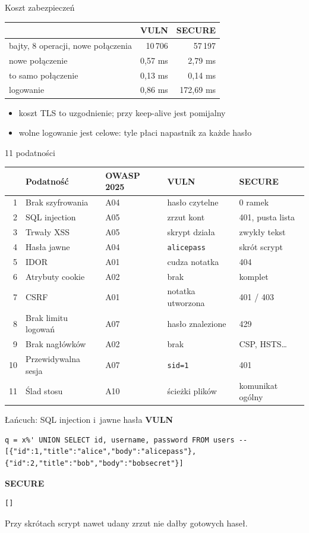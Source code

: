 \documentclass[aspectratio=169,10pt]{beamer}
\newcommand{\kod}[1]{\texttt{#1}}
\newcommand{\vuln}{\textcolor{v}{\textbf{VULN}}}
\newcommand{\secure}{\textcolor{s}{\textbf{SECURE}}}
\begin{document}
\begin{frame}{Koszt zabezpieczeń}
\begin{tabular}{lrr}
\toprule
& \vuln & \secure\\\midrule
bajty, 8 operacji, nowe połączenia & 10\,706 & 57\,197\\
nowe połączenie & 0{,}57 ms & 2{,}79 ms\\
to samo połączenie & 0{,}13 ms & 0{,}14 ms\\
logowanie & 0{,}86 ms & 172{,}69 ms\\
\bottomrule
\end{tabular}
\begin{itemize}
\item koszt TLS to uzgodnienie; przy keep-alive jest pomijalny
\item wolne logowanie jest celowe: tyle płaci napastnik za każde hasło
\end{itemize}
\end{frame}

\begin{frame}{11 podatności}
\footnotesize
\begin{tabular}{rllll}
\toprule
& Podatność & OWASP 2025 & \vuln & \secure\\\midrule
1 & Brak szyfrowania & A04 & hasło czytelne & 0 ramek\\
2 & SQL injection & A05 & zrzut kont & 401, pusta lista\\
3 & Trwały XSS & A05 & skrypt działa & zwykły tekst\\
4 & Hasła jawne & A04 & \kod{alicepass} & skrót scrypt\\
5 & IDOR & A01 & cudza notatka & 404\\
6 & Atrybuty cookie & A02 & brak & komplet\\
7 & CSRF & A01 & notatka utworzona & 401 / 403\\
8 & Brak limitu logowań & A07 & hasło znalezione & 429\\
9 & Brak nagłówków & A02 & brak & CSP, HSTS\dots\\
10 & Przewidywalna sesja & A07 & \kod{sid=1} & 401\\
11 & Ślad stosu & A10 & ścieżki plików & komunikat ogólny\\
\bottomrule
\end{tabular}
\end{frame}

\begin{frame}[fragile]{Łańcuch: SQL injection i~jawne hasła}
\textcolor{v}{\textbf{VULN}}
\begin{Verbatim}[fontsize=\footnotesize,breaklines]
q = x%' UNION SELECT id, username, password FROM users --
[{"id":1,"title":"alice","body":"alicepass"},{"id":2,"title":"bob","body":"bobsecret"}]
\end{Verbatim}
\textcolor{s}{\textbf{SECURE}}
\begin{Verbatim}[fontsize=\footnotesize]
[]
\end{Verbatim}
Przy skrótach scrypt nawet udany zrzut nie dałby gotowych haseł.
\end{frame}
\end{document}
